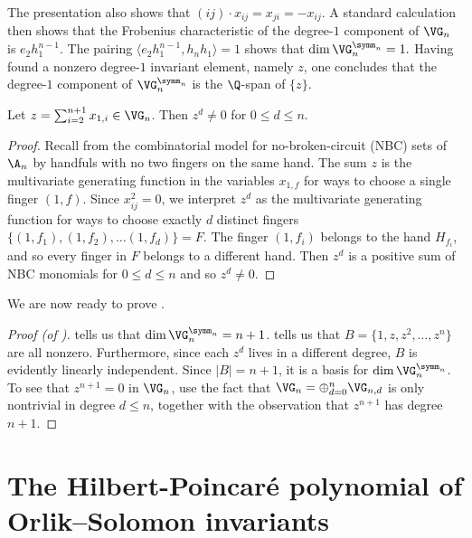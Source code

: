 \documentclass{amsart}
\begin{document}
The presentation also shows that $(ij)\cdot x_{ij} = x_{ji} = -x_{ij}$.
A standard calculation then shows that the Frobenius characteristic of the degree-$1$ component of $\VG_n$ is $e_2h_1^{n-1}$.
The pairing $\langle e_2 h_1^{n-1}, h_n h_1 \rangle = 1$ shows that $\dim \VG_n^{\symm_{n}} = 1.$
Having found a nonzero degree-$1$ invariant element, namely $z$, one concludes that the degree-$1$ component of $\VG_n^{\symm_n}$ is the $\Q$-span of $\{z\}$.

\begin{lemma}\label{lem:PowersOfVGGenerator}
    Let $z = \sum_{i=2}^{n+1} x_{1,i} \in \VG_n$.
    Then $z^d \neq 0$ for $0\leq d\leq n$.
\end{lemma}

\begin{proof}
    Recall from  the combinatorial model for no-broken-circuit (NBC) sets of $\A_n$ by handfuls with no two fingers on the same hand.
    The sum $z$ is the multivariate generating function in the variables $x_{1,f}$ for ways to choose a single finger $(1,f)$.
    Since $x_{ij}^2=0$, we interpret $z^d$ as the multivariate generating function for ways to choose exactly $d$ distinct fingers $\{(1,f_1), (1,f_2),\ldots (1,f_d)\}=F$. 
    The finger $(1,f_i)$ belongs to the hand $H_{f_i}$, and so every finger in $F$ belongs to a different hand.
    Then $z^d$ is a positive sum of NBC monomials for $0 \leq d \leq n$ and so $z^d \neq 0$.
\end{proof}

We are now ready to prove .

\begin{proof}[Proof (of )]

 tells us that $\dim \VG_n^{\symm_n} = n+1$.
 tells us that $B = \{1,z,z^2,\ldots,z^n\}$ are all nonzero.
Furthermore, since each $z^d$ lives in a different degree, $B$ is evidently linearly independent.
Since $|B|=n+1$, it is a basis for $\dim \VG_n^{\symm_n}$.
To see that $z^{n+1} = 0$ in $\VG_n$, use the fact that $\VG_n = \oplus_{d=0}^{n} \VG_{n,d}$ is only nontrivial in degree $d \leq n$, together with the observation that $z^{n+1}$ has degree $n+1$.
\end{proof}

\section{The Hilbert-Poincar\'e polynomial of Orlik--Solomon invariants}\label{sec:HilbOS}
\end{document}
